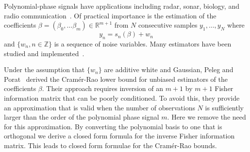 \documentclass[review]{elsarticle}
\newcommand{\reals}{{\mathbb R}}
\newcommand{\ints}{{\mathbb Z}}
\begin{document}
Polynomial-phase signals have applications including radar, sonar, biology, and radio communication~\cite{Angeby_estimating_2000,Levanon_Radar_signals_2004}.  %
Of practical importance is the estimation of the coefficients $\beta = (\beta_0, \dots \beta_m)\in\reals^{m+1}$ from $N$ consecutive samples $y_1, \dots, y_N$ where 
\begin{equation}\label{eq:yndatamodel}
y_n = s_n(\beta) + w_n
\end{equation}
and $\{w_n, n \in \ints\}$ is a sequence of noise variables.  Many estimators have been studied and implemented~\cite{Angeby_estimating_2000,Oshea_cpf_2004,Morelande_bayes_unwrapping_2009_tsp,Kitchen_polyphase_unwrapping_1994,Peleg_DPT_1995, Djuric_phase_unwrap_chirp_1990}.  


Under the assumption that $\{w_n\}$ are additive white and Gaussian, Peleg and Porat~\cite{Peleg1991_CRB_PPS_1991} derived the Cram\'{e}r-Rao lower bound for unbiased estimators of the coefficients $\beta$.  Their approach requires inversion of an $m+1$ by $m+1$ Fisher information matrix that can be poorly conditioned.  To avoid this, they provide an approximation that is valid when the number of observations $N$ is sufficiently larger than the order of the polynomial phase signal $m$.  Here we remove the need for this approximation.  By converting the polynomial basis to one that is orthogonal we derive a closed form formula for the inverse Fisher information matrix.  This leads to closed form formulae for the Cram\'{e}r-Rao bounds.  %
\end{document}
